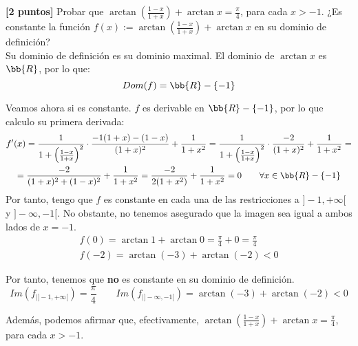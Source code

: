 \documentclass[12pt]{article}
\begin{document}
\begin{ejercicio}\textbf{[2 puntos]}
    Probar que $\arctan \left(\frac{1-x}{1+x}\right) + \arctan x = \frac{\pi}{4}$, para cada $x>-1$. ¿Es constante la función $f(x):=\arctan \left(\frac{1-x}{1+x}\right) + \arctan x$ en su dominio de definición?\\

    Su dominio de definición es su dominio maximal. El dominio de $\arctan x$ es $\bb{R}$, por lo que:
    \begin{equation*}
        Dom(f)=\bb{R}-\{-1\}
    \end{equation*}

    Veamos ahora si es constante. $f$ es derivable en $\bb{R}-\{-1\}$, por lo que calculo su primera derivada:
    \begin{multline*}
        f'(x) = \frac{1}{1+\left(\frac{1-x}{1+x}\right)^2} \cdot \frac{-1(1+x)-(1-x)}{(1+x)^2} + \frac{1}{1+x^2}
        = \frac{1}{1+\left(\frac{1-x}{1+x}\right)^2} \cdot \frac{-2}{(1+x)^2} + \frac{1}{1+x^2}
        =\\=
        \frac{-2}{(1+x)^2+(1-x)^2} + \frac{1}{1+x^2}
        = \frac{-2}{2(1+x^2)} + \frac{1}{1+x^2} = 0 \qquad \forall x \in \bb{R}-\{-1\}
    \end{multline*}
    Por tanto, tengo que $f$ es constante en cada una de las restricciones a $]-1, +\infty[$ y $]-\infty, -1[$. No obstante, no tenemos asegurado que la imagen sea igual a ambos lados de $x=-1$.
    \begin{gather*}
        f(0)=\arctan 1 + \arctan 0 = \frac{\pi}{4} + 0 = \frac{\pi}{4} \\
        f(-2) = \arctan(-3) + \arctan (-2) < 0
    \end{gather*}

    Por tanto, tenemos que \textbf{no} es constante en su dominio de definición.
    \begin{equation*}
        Im(f_{|]-1, +\infty[}) = \frac{\pi}{4} \qquad Im(f_{|]-\infty, -1[}) = \arctan(-3) + \arctan (-2) < 0
    \end{equation*}

    Además, podemos afirmar que, efectivamente, $\arctan \left(\frac{1-x}{1+x}\right) + \arctan x = \frac{\pi}{4}$, para cada $x>-1$.
\end{ejercicio}
\end{document}
